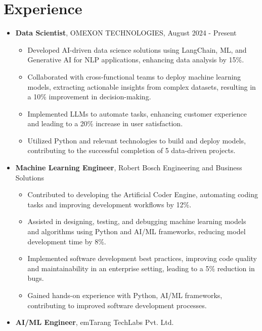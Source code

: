 \documentclass{article}
\begin{document}
    \section{Experience}
    \begin{itemize}[noitemsep, topsep=0pt]
        \item \textbf{Data Scientist}, OMEXON TECHNOLOGIES, August 2024 - Present
            \begin{itemize}[noitemsep, topsep=0pt]
                \item Developed AI-driven data science solutions using LangChain, ML, and Generative AI for NLP applications, enhancing data analysis by 15\%.
                \item Collaborated with cross-functional teams to deploy machine learning models, extracting actionable insights from complex datasets, resulting in a 10\% improvement in decision-making.
                \item Implemented LLMs to automate tasks, enhancing customer experience and leading to a 20\% increase in user satisfaction.
                \item Utilized Python and relevant technologies to build and deploy models, contributing to the successful completion of 5 data-driven projects.
            \end{itemize}
        \item \textbf{Machine Learning Engineer}, Robert Bosch Engineering and Business Solutions
            \begin{itemize}[noitemsep, topsep=0pt]
                \item Contributed to developing the Artificial Coder Engine, automating coding tasks and improving development workflows by 12\%.
                \item Assisted in designing, testing, and debugging machine learning models and algorithms using Python and AI/ML frameworks, reducing model development time by 8\%.
                \item Implemented software development best practices, improving code quality and maintainability in an enterprise setting, leading to a 5\% reduction in bugs.
                \item Gained hands-on experience with Python, AI/ML frameworks, contributing to improved software development processes.
            \end{itemize}
        \item \textbf{AI/ML Engineer}, emTarang TechLabs Pvt. Ltd.
            \begin{itemize}[noitemsep, topsep=0pt]

\end{itemize}
\end{itemize}
\end{document}
